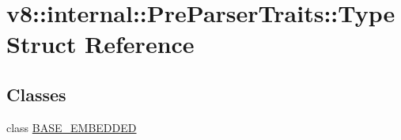 \hypertarget{structv8_1_1internal_1_1_pre_parser_traits_1_1_type}{}\section{v8\+:\+:internal\+:\+:Pre\+Parser\+Traits\+:\+:Type Struct Reference}
\label{structv8_1_1internal_1_1_pre_parser_traits_1_1_type}
\subsection*{Classes}
\begin{DoxyCompactItemize}
\item 
class \hyperlink{classv8_1_1internal_1_1_pre_parser_traits_1_1_type_1_1_b_a_s_e___e_m_b_e_d_d_e_d}{B\+A\+S\+E\+\_\+\+E\+M\+B\+E\+D\+D\+E\+D}
\end{DoxyCompactItemize}
